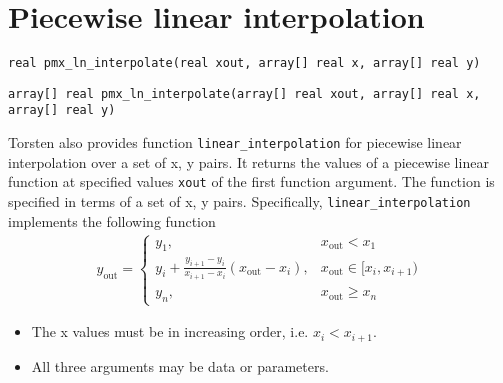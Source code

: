 \documentclass[12pt, reqno, oneside]{amsbook}
\numberwithin{equation}{chapter}
\numberwithin{figure}{chapter}
\numberwithin{table}{chapter}
\theoremstyle{remark}
\begin{document}
\section{Piecewise linear interpolation}
\label{sec:org5f1a4b1}
\begin{verbatim}
real pmx_ln_interpolate(real xout, array[] real x, array[] real y)
\end{verbatim}
\begin{verbatim}
array[] real pmx_ln_interpolate(array[] real xout, array[] real x, array[] real y)
\end{verbatim}
Torsten also provides function \texttt{linear\_interpolation} for piecewise linear interpolation over a
set of x, y pairs. It returns the values of a piecewise linear
function at specified values \texttt{xout} of the first function argument. The
function is specified in terms of a set of x, y
pairs. Specifically, \texttt{linear\_interpolation} implements the following function
\begin{align*}
  y_{\text{out}} = \left\{\begin{array}{ll}
                 y_1, & x_{\text{out}} < x_1 \\
                 y_i + \frac{y_{i+1} - y_i}{x_{i+1} - x_i}
                 \left(x_{\text{out}} - x_i\right), & x_{\text{out}} \in [x_i, x_{i+1}) \\
                 y_n, & x_{\text{out}} \ge x_n
                          \end{array}\right.
\end{align*}
\begin{itemize}
\item The x values must be in increasing order, i.e. \(x_i < x_{i+1}\).
\item All three arguments may be data or parameters.
\end{itemize}
\end{document}
